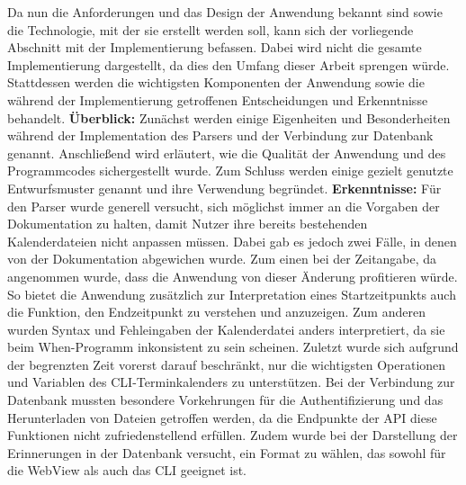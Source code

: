 %
	Da nun die Anforderungen und das Design der Anwendung bekannt sind sowie die Technologie, mit der sie erstellt werden soll, kann sich der vorliegende Abschnitt mit der Implementierung befassen.
	Dabei wird nicht die gesamte Implementierung dargestellt, da dies den Umfang dieser Arbeit sprengen würde. Stattdessen werden die wichtigsten Komponenten der Anwendung sowie die während der Implementierung getroffenen Entscheidungen und Erkenntnisse behandelt.%
\newline%
\textbf{Überblick:}\newline%
Zunächst werden einige Eigenheiten und Besonderheiten während der Implementation des Parsers und der Verbindung zur Datenbank genannt. Anschließend wird erläutert, wie die Qualität der Anwendung und des Programmcodes sichergestellt wurde. Zum Schluss werden einige gezielt genutzte Entwurfsmuster genannt und ihre Verwendung begründet.%
\newline%
\textbf{Erkenntnisse:}\newline%
	Für den Parser wurde generell versucht, sich möglichst immer an die Vorgaben der Dokumentation zu halten, damit Nutzer ihre bereits bestehenden Kalenderdateien nicht anpassen müssen. Dabei gab es jedoch zwei Fälle, in denen von der Dokumentation abgewichen wurde. %
		Zum einen bei der Zeitangabe, da angenommen wurde, dass die Anwendung von dieser Änderung profitieren würde. So bietet die Anwendung zusätzlich zur Interpretation eines Startzeitpunkts auch die Funktion, den Endzeitpunkt zu verstehen und anzuzeigen. %
		Zum anderen wurden Syntax und Fehleingaben der Kalenderdatei anders interpretiert, da sie beim When-Programm inkonsistent zu sein scheinen. %
		Zuletzt wurde sich aufgrund der begrenzten Zeit vorerst darauf beschränkt, nur die wichtigsten Operationen und Variablen des CLI-Terminkalenders zu unterstützen.%
	\newline%
	Bei der Verbindung zur Datenbank mussten besondere Vorkehrungen für die Authentifizierung und das Herunterladen von Dateien getroffen werden, da die Endpunkte der API diese Funktionen nicht zufriedenstellend erfüllen. Zudem wurde bei der Darstellung der Erinnerungen in der Datenbank versucht, ein Format zu wählen, das sowohl für die WebView als auch das CLI geeignet ist.%
